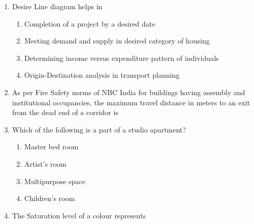 \documentclass[journal,12pt,onecolumn]{IEEEtran}
\theoremstyle{remark}
\begin{document}
\begin{enumerate}
\begin{enumerate}
\end{enumerate}
\item  Desire Line diagram helps in
    \begin{enumerate}
        \item Completion of a project by a desired date
        \item Meeting demand and supply in desired category of housing
        \item Determining income versus expenditure pattern of individuals
        \item Origin-Destination analysis in transport planning
    \end{enumerate}
 \item  As per Fire Safety norms of NBC India for buildings having assembly and institutional occupancies, the maximum travel distance in meters to an exit from the dead end of a corridor is
    \begin{enumerate}
    \end{enumerate}
\item  Which of the following is a part of a studio apartment?
    \begin{enumerate}
        \item Master bed room
        \item Artist's room
        \item Multipurpose space
        \item Children's room
    \end{enumerate}
\item The Saturation level of a colour represents
    \begin{enumerate}
\end{enumerate}
\end{enumerate}
\end{document}
